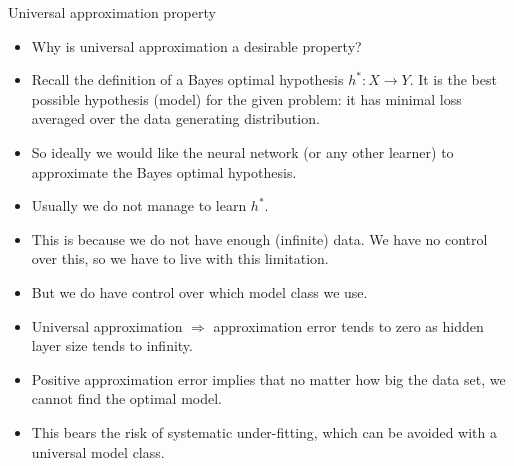 \begin{vbframe}{Universal approximation property}
  \begin{itemize}
  \item Why is universal approximation a desirable property?
  \vspace{2mm}
  \item Recall the definition of a Bayes optimal hypothesis $h^* : X \to Y$.
    It is the best possible hypothesis (model) for the given problem:
    it has minimal loss averaged over the data generating distribution.
  \vspace{2mm}
  \item So ideally we would like the neural network (or any other
    learner) to approximate the Bayes optimal hypothesis.
  \vspace{2mm}
  \item Usually we do not manage to learn $h^*$.
  \vspace{2mm}
  \item This is because we do not have enough (infinite) data. We have
    no control over this, so we have to live with this limitation.
  \vspace{2mm}
  \item But we do have control over which model class we use.
  \end{itemize}

  \framebreak

  \begin{itemize}
    \vspace{10mm}
    \item Universal approximation $\Rightarrow$ approximation error tends
    to zero as hidden layer size tends to infinity.
    \vspace{5mm}
    \item Positive approximation error implies that no matter  how %
    big the data set, we cannot find the optimal model.
    \vspace{5mm}
    \item This bears the risk of systematic under-fitting, which can be avoided with a universal model class.
  \end{itemize}

  \framebreak


\end{vbframe}
